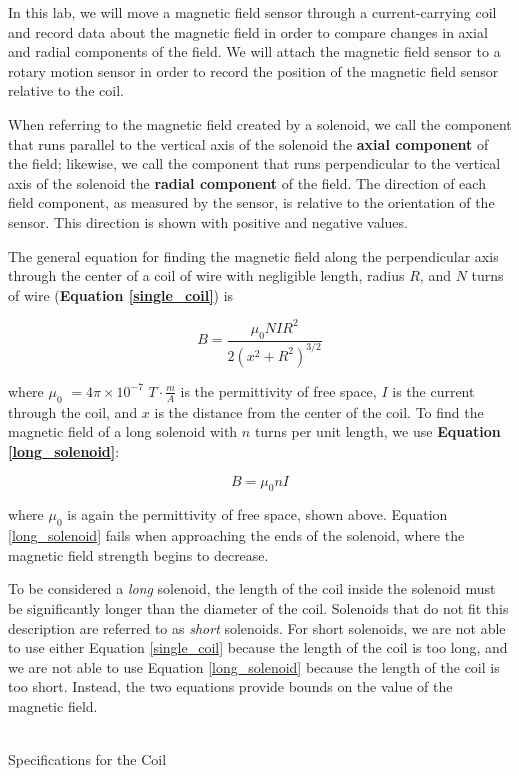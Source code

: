 In this lab, we will move a magnetic field sensor through a current-carrying coil and record data about the magnetic field in order to compare changes in axial and radial components of the field. We will attach the magnetic field sensor to a rotary motion sensor in order to record the position of the magnetic field sensor relative to the coil.

\bigskip
When referring to the magnetic field created by a solenoid, we call the component that runs parallel to the vertical axis of the solenoid the \textbf{axial component} of the field; likewise, we call the component that runs perpendicular to the vertical axis of the solenoid the \textbf{radial component} of the field. The direction of each field component, as measured by the sensor, is relative to the orientation of the sensor. This direction is shown with positive and negative values.

\bigskip
The general equation for finding the magnetic field along the perpendicular axis through the center of a coil of wire with negligible length, radius $R$, and $N$ turns of wire (\textbf{Equation \ref{single_coil}}) is

\begin{equation} \label{single_coil}
B = \frac{\mu_0 N I R^2}{2 ( x^2 + R^2 )^{3/2}}
\end{equation}

where \textbf{$\mu_0$} $= 4 \pi \times 10^{-7}$ $T \cdot \frac{m}{A}$ is the permittivity of free space, \textbf{$I$} is the current through the coil, and \textbf{$x$} is the distance from the center of the coil. To find the magnetic field of a long solenoid with $n$ turns per unit length, we use \textbf{Equation \ref{long_solenoid}}:

\begin{equation} \label{long_solenoid}
B = \mu_0 n I
\end{equation}

where $\mu_0$ is again the permittivity of free space, shown above. Equation \ref{long_solenoid} fails when approaching the ends of the solenoid, where the magnetic field strength begins to decrease.

\bigskip
To be considered a \textit{long} solenoid, the length of the coil inside the solenoid must be significantly longer than the diameter of the coil. Solenoids that do not fit this description are referred to as \textit{short} solenoids. For short solenoids, we are not able to use either Equation \ref{single_coil} because the length of the coil is too long, and we are not able to use Equation \ref{long_solenoid} because the length of the coil is too short. Instead, the two equations provide bounds on the value of the magnetic field.

\bigskip
\bigskip
\begin{minipage}{\textwidth}
    \centering
    
    \\ \medskip
    Specifications for the Coil
\end{minipage}